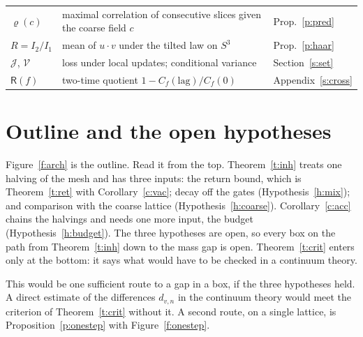 \begin{table}[htbp]
\begin{tabular}{@{}l>{\raggedright\arraybackslash}p{}l@{}}
$\varrho(c)$ & maximal correlation of consecutive slices given the coarse field $c$ & Prop.~\ref{p:pred} \\
$R=I_2/I_1$ & mean of $u\cdot v$ under the tilted law on $S^3$ & Prop.~\ref{p:haar} \\
$\mathcal J$, $\mathcal V$ & loss under local updates; conditional variance & Section~\ref{s:set} \\
$\mathsf R(f)$ & two-time quotient $1-C_f(\text{lag})/C_f(0)$ & Appendix~\ref{s:cross} \\
\bottomrule
\end{tabular}
\end{table}

\section{Outline and the open hypotheses}\label{s:arch}
Figure~\ref{f:arch} is the outline. Read it from the top. Theorem~\ref{t:inh} treats one halving of the mesh and
has three inputs: the return bound, which is Theorem~\ref{t:ret} with Corollary~\ref{c:vac}; decay off the
gates (Hypothesis~\ref{h:mix}); and comparison with the coarse lattice (Hypothesis~\ref{h:coarse}).
Corollary~\ref{c:acc} chains the halvings and needs one more input, the budget (Hypothesis~\ref{h:budget}). The
three hypotheses are open, so every box on the path from Theorem~\ref{t:inh} down to the mass gap is open.
Theorem~\ref{t:crit} enters only at the bottom: it says what would have to be checked in a continuum theory.

This would be one sufficient route to a gap in a box, if the three hypotheses held. A direct estimate of
the differences $d_{v,n}$ in the continuum theory would meet the criterion of Theorem~\ref{t:crit} without
it. A second route, on a single lattice, is Proposition~\ref{p:onestep} with Figure~\ref{f:onestep}.

